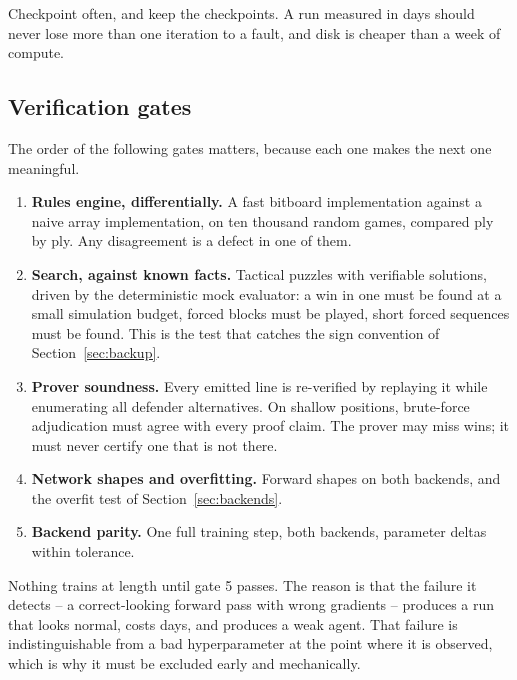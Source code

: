 Checkpoint often, and keep the checkpoints. A run measured in days should never
lose more than one iteration to a fault, and disk is cheaper than a week of
compute.

\subsection{Verification gates}
\label{sec:gates}

The order of the following gates matters, because each one makes the next one
meaningful.

\begin{enumerate}
  \item \textbf{Rules engine, differentially.} A fast bitboard implementation
        against a naive array implementation, on ten thousand random games,
        compared ply by ply. Any disagreement is a defect in one of them.
  \item \textbf{Search, against known facts.} Tactical puzzles with verifiable
        solutions, driven by the deterministic mock evaluator: a win in one must
        be found at a small simulation budget, forced blocks must be played,
        short forced sequences must be found. This is the test that catches the
        sign convention of Section~\ref{sec:backup}.
  \item \textbf{Prover soundness.} Every emitted line is re-verified by replaying
        it while enumerating all defender alternatives. On shallow positions,
        brute-force adjudication must agree with every proof claim. The prover
        may miss wins; it must never certify one that is not there.
  \item \textbf{Network shapes and overfitting.} Forward shapes on both backends,
        and the overfit test of Section~\ref{sec:backends}.
  \item \textbf{Backend parity.} One full training step, both backends,
        parameter deltas within tolerance.
\end{enumerate}

Nothing trains at length until gate 5 passes. The reason is that the failure it
detects -- a correct-looking forward pass with wrong gradients -- produces a run
that looks normal, costs days, and produces a weak agent. That failure is
indistinguishable from a bad hyperparameter at the point where it is observed,
which is why it must be excluded early and mechanically.
